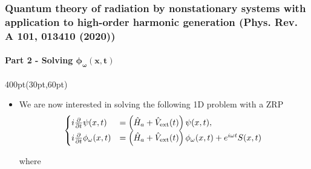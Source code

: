 

\begin{frame}
\frametitle{Quantum theory of radiation by nonstationary systems 
	with application to high-order harmonic generation
        (Phys. Rev. A 101, 013410 (2020))}
        \framesubtitle{Part 2 - Solving $\boldsymbol{\phi_\omega(x,t)}$}
\footnotesize
\begin{textblock*}{400pt}(30pt,60pt)
\begin{itemize}
\item We are now interested in solving 
the following 1D problem with a ZRP
\begin{align}
\begin{cases}
	i\frac{\partial}{\partial t}\psi(x,t)
	   & = \left( \hat{H}_a + \hat{V}_{\rm ext}(t)\right) 
	   \psi(x,t),\\
	i\frac{\partial}{\partial t}\phi_\omega(x,t)
	   & = \left( \hat{H}_a + \hat{V}_{\rm ext}(t)\right) 
	   \phi_\omega (x,t)
	   + e^{i\omega t} S(x,t)\,
\end{cases}
\end{align}

where


\end{itemize}
\end{textblock*}
\end{frame}
